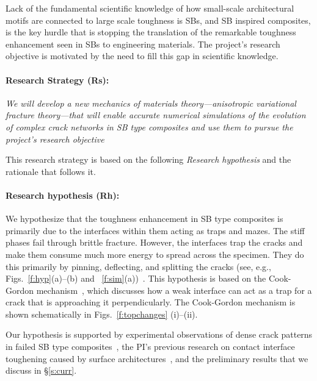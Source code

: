\documentclass[10pt,letterpaper]{article}
\begin{document}
 Lack of the  fundamental scientific knowledge of how small-scale architectural motifs are connected to large scale toughness is SBs, and SB inspired composites, is the key hurdle that is stopping the  translation of the remarkable  toughness enhancement seen in SBs to engineering materials.  The  project's research objective  is   motivated by the  need to fill this gap in scientific knowledge.%





\paragraph{Research Strategy (Rs):} \emph{We  will   develop a new mechanics of materials theory---anisotropic variational fracture theory---that will enable accurate numerical simulations of the evolution of complex crack networks in SB type composites and use them to pursue the project's research objective}%


This research strategy  is based on the following \emph{Research  hypothesis} and the rationale  that follows it.%

\paragraph{Research hypothesis (Rh):}  We hypothesize that the toughness enhancement in SB type composites  is primarily due to the interfaces within them acting as traps and mazes. The stiff phases fail through brittle fracture. However, the interfaces trap the cracks and make them consume much more energy to spread across the specimen. They do this primarily by pinning, deflecting, and splitting the cracks (see, e.g., Figs.~\ref{f:hyp}(a)--(b) and ~\ref{f:sim}(a))~\cite{gao1989first,dalmas2009crack,gu1997crack}. This hypothesis  is based  on the Cook-Gordon mechanism~\cite{XXX}, which discusses how a weak interface can act as a trap for a crack  that is approaching it perpendicularly.   The Cook-Gordon mechanism is shown schematically  in Figs.~\ref{f:topchanges} (i)--(ii).%

Our hypothesis  is supported by  experimental observations of dense crack patterns in failed SB type composites~\cite{barthelat2007experimental,poissant2010novel}, the PI's previous research on contact interface toughening caused by surface architectures~\cite{kesari2010role,kesari2011mechanics,kesariPML}, and the   preliminary results that we discuss in \S \ref{s:curr}.%
\end{document}
